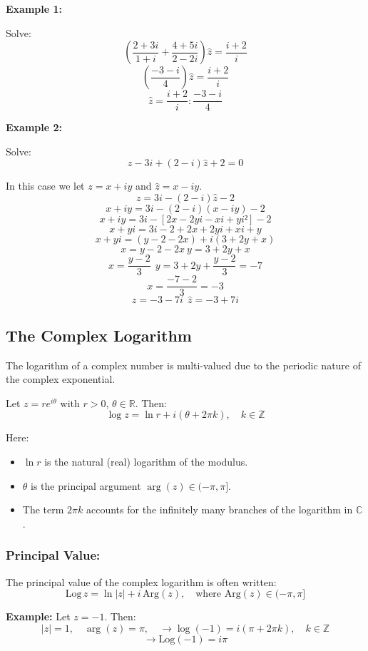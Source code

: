 \textbf{Example 1:}

Solve:
\[
	\left( \frac{2 + 3i}{1 + i} + \frac{4 + 5i}{2 - 2i}\right) \hat{z} = \frac{i + 2}{i}
\]
\[
	\left( \frac{-3 -i}{4} \right) \hat{z} = \frac{i + 2}{i}
\]
\[
	\hat{z} = \frac{i + 2}{i} : \frac{-3 -i}{4}
\]

\textbf{Example 2:}

Solve:
\[
	z - 3i + (2 -i)\hat{z} + 2 = 0
\]

In this case we let \( z = x + iy \) and \( \hat{z} = x - iy \).
\[
	z = 3i - (2 - i)\hat{z} - 2
\]
\[
	x + iy = 3i - (2 - i)(x - iy) - 2
\]
\[
	x + iy = 3i - [2x - 2yi -xi +yi²] - 2
\]
\[
	x + yi = 3i - 2 + 2x + 2yi + xi + y
\]
\[
	x + yi = (y - 2 -2x) + i(3 + 2y + x)
\]
\[
	x = y - 2 -2x\ y = 3 + 2y + x
\]
\[
	x = \frac{y - 2}{3}\ \ y = 3 + 2y + \frac{y-2}{3} = -7
\]
\[
	x = \frac{-7 -2}{3} = -3
\]
\[
	z = -3 -7i\ \ \hat{z} = -3 + 7i
\]
\subsection{The Complex Logarithm}

The logarithm of a complex number is multi-valued due to the periodic nature of the complex exponential.

Let \( z = re^{i\theta} \) with \( r > 0 \), \( \theta \in \mathbb{R} \). Then:
\[
	\log z = \ln r + i(\theta + 2\pi k), \quad k \in \mathbb{Z}
\]

Here:
\begin{itemize}[label=\(-\)]
	\item \( \ln r \) is the natural (real) logarithm of the modulus.
	\item \( \theta \) is the principal argument \( \arg(z) \in (-\pi, \pi] \).
	\item The term \( 2\pi k \) accounts for the infinitely many branches of the logarithm in \( \mathbb{C} \).
\end{itemize}

\subsubsection*{Principal Value:}
The principal value of the complex logarithm is often written:
\[
	\mathrm{Log}\,z = \ln |z| + i\,\mathrm{Arg}(z), \quad \text{where } \mathrm{Arg}(z) \in (-\pi, \pi]
\]

\textbf{Example:}
Let \( z = -1 \). Then:
\[
	|z| = 1, \quad \arg(z) = \pi, \quad \to \log(-1) = i(\pi + 2\pi k), \quad k \in \mathbb{Z}
\]
\[
	\to \mathrm{Log}(-1) = i\pi
\]

